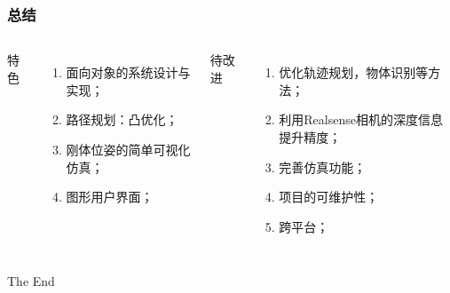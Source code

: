 \documentclass{beamer}
\begin{document}
\begin{frame}
    \frametitle{总结}
    \begin{columns}
        \begin{center}
            特色
        \end{center}
        \begin{enumerate}
            \item 面向对象的系统设计与实现；
            \item 路径规划：凸优化；
            \item 刚体位姿的简单可视化仿真；
            \item 图形用户界面；
        \end{enumerate}
        \begin{center}
            待改进
        \end{center}
        \begin{enumerate}
            \item 优化轨迹规划，物体识别等方法；
            \item 利用Realsense相机的深度信息提升精度；
            \item 完善仿真功能；
            \item 项目的可维护性；
            \item 跨平台；
        \end{enumerate}
    \end{columns}
\end{frame}


\begin{frame}
    \Huge{\centerline{The End}}
\end{frame}

\end{document}
